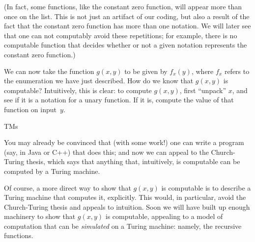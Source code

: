 \documentclass[../../../include/open-logic-section]{subfiles}
\begin{document}
(In fact, some functions, like the constant zero function, will appear
more than once on the list. This is not just an artifact of our
coding, but also a result of the fact that the constant zero function has
more than one notation. We will later see that one can not computably
avoid these repetitions; for example, there is no computable function
that decides whether or not a given notation represents the constant
zero function.)

We can now take the function $g(x,y)$ to be given by $f_x(y)$, where
$f_x$ refers to the enumeration we have just described. How do we know
that $g(x,y)$ is computable? Intuitively, this is clear: to compute
$g(x,y)$, first ``unpack'' $x$, and see if it is a notation for a unary
function. If it is, compute the value of that function on input~$y$.

\begin{tagblock}{TMs}
\begin{digress}
You may already be convinced that (with some work!) one can write a
program (say, in Java or C++) that does this; and now we can appeal to
the Church-Turing thesis, which says that anything that, intuitively,
is computable can be computed by a Turing machine.

Of course, a more direct way to show that $g(x,y)$ is computable is to
describe a Turing machine that computes it, explicitly. This would,
in particular, avoid the Church-Turing thesis and appeals to
intuition. Soon we will have built up enough machinery to show
that $g(x,y)$ is computable, appealing to a model of computation that
can be \emph{simulated} on a Turing machine: namely, the recursive
functions.
\end{digress}
\end{tagblock}
\end{document}

